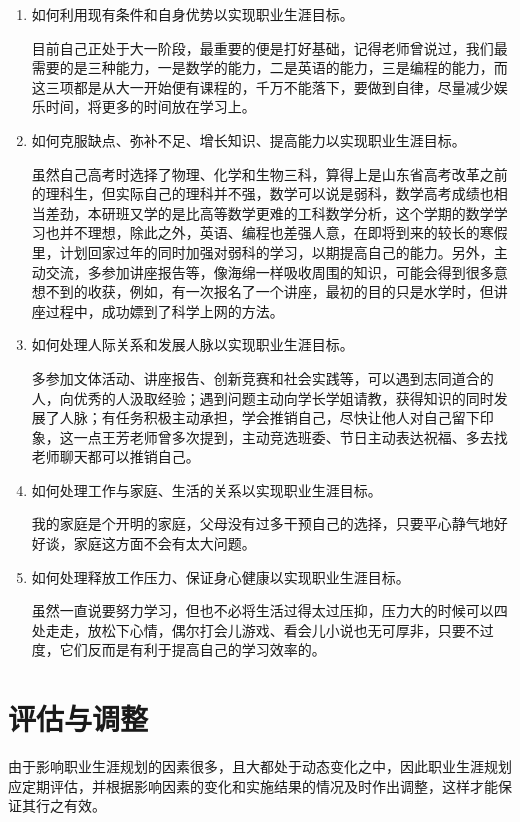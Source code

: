 \documentclass{article}
\begin{document}
\begin{enumerate}[1、]
	\item 如何利用现有条件和自身优势以实现职业生涯目标。\par
	目前自己正处于大一阶段，最重要的便是打好基础，记得老师曾说过，我们最需要的是三种能力，一是数学的能力，二是英语的能力，三是编程的能力，而这三项都是从大一开始便有课程的，千万不能落下，要做到自律，尽量减少娱乐时间，将更多的时间放在学习上。\par
	\item 如何克服缺点、弥补不足、增长知识、提高能力以实现职业生涯目标。\par
	虽然自己高考时选择了物理、化学和生物三科，算得上是山东省高考改革之前的理科生，但实际自己的理科并不强，数学可以说是弱科，数学高考成绩也相当差劲，本研班又学的是比高等数学更难的工科数学分析，这个学期的数学学习也并不理想，除此之外，英语、编程也差强人意，在即将到来的较长的寒假里，计划回家过年的同时加强对弱科的学习，以期提高自己的能力。另外，主动交流，多参加讲座报告等，像海绵一样吸收周围的知识，可能会得到很多意想不到的收获，例如，有一次报名了一个讲座，最初的目的只是水学时，但讲座过程中，成功嫖到了科学上网的方法。\par
	\item 如何处理人际关系和发展人脉以实现职业生涯目标。\par
	多参加文体活动、讲座报告、创新竞赛和社会实践等，可以遇到志同道合的人，向优秀的人汲取经验；遇到问题主动向学长学姐请教，获得知识的同时发展了人脉；有任务积极主动承担，学会推销自己，尽快让他人对自己留下印象，这一点王芳老师曾多次提到，主动竞选班委、节日主动表达祝福、多去找老师聊天都可以推销自己。\par
	\item 如何处理工作与家庭、生活的关系以实现职业生涯目标。\par
	我的家庭是个开明的家庭，父母没有过多干预自己的选择，只要平心静气地好好谈，家庭这方面不会有太大问题。\par
	\item 如何处理释放工作压力、保证身心健康以实现职业生涯目标。\par
	虽然一直说要努力学习，但也不必将生活过得太过压抑，压力大的时候可以四处走走，放松下心情，偶尔打会儿游戏、看会儿小说也无可厚非，只要不过度，它们反而是有利于提高自己的学习效率的。\par

\end{enumerate}

\section{评估与调整}
由于影响职业生涯规划的因素很多，且大都处于动态变化之中，因此职业生涯规划应定期评估，并根据影响因素的变化和实施结果的情况及时作出调整，这样才能保证其行之有效。\par 
\end{document}
